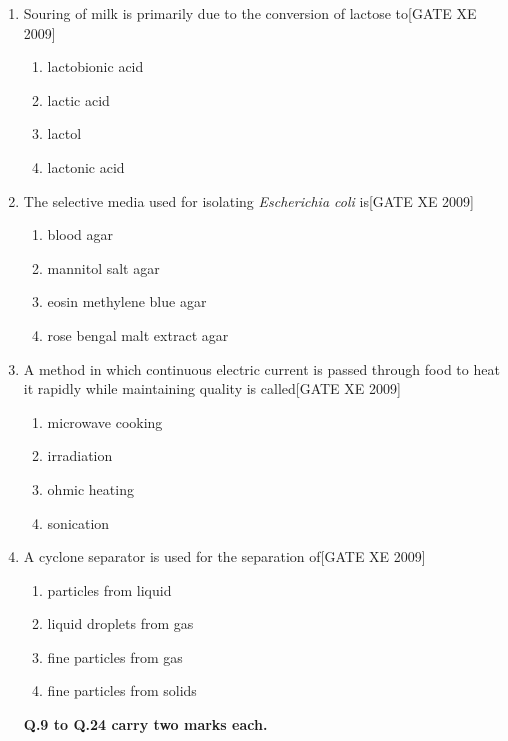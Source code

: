 \documentclass[journal,12pt,onecolumn]{IEEEtran}
\theoremstyle{remark}
\begin{document}
\begin{enumerate}[label=\textbf{Q.\arabic*.}, wide=0pt, leftmargin=*]
\item Souring of milk is primarily due to the conversion of lactose to\hfill[GATE XE 2009]
\begin{multicols}{2}
\begin{enumerate}
\item lactobionic acid
\item lactic acid
\item lactol
\item lactonic acid
\end{enumerate}
\end{multicols}

\item The selective media used for isolating \textit{Escherichia coli} is\hfill[GATE XE 2009]
\begin{multicols}{2}
\begin{enumerate}
\item blood agar
\item mannitol salt agar
\item eosin methylene blue agar
\item rose bengal malt extract agar
\end{enumerate}
\end{multicols}

\item A method in which continuous electric current is passed through food to heat it rapidly while maintaining quality is called\hfill[GATE XE 2009]
\begin{multicols}{2}
\begin{enumerate}
\item microwave cooking
\item irradiation
\item ohmic heating
\item sonication
\end{enumerate}
\end{multicols}

\item A cyclone separator is used for the separation of\hfill[GATE XE 2009]
\begin{multicols}{2}
\begin{enumerate}
\item particles from liquid
\item liquid droplets from gas
\item fine particles from gas
\item fine particles from solids
\end{enumerate}
\end{multicols}
\noindent \textbf{Q.9 to Q.24 carry two marks each.}




\end{enumerate}
\end{document}
